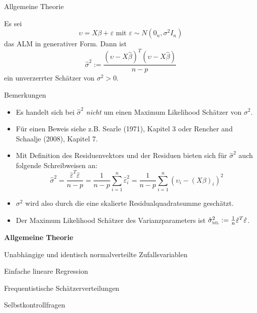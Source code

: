 \documentclass[
  8pt,
  ignorenonframetext,
]{beamer}
\providecommand{\tightlist}{%
  \setlength{\itemsep}{0pt}\setlength{\parskip}{0pt}}
\begin{document}
\begin{frame}{Allgemeine Theorie}
\protect\hypertarget{allgemeine-theorie-5}{}
\footnotesize
{}
\begin{theorem}[Varianzparameterschätzer]
\justifying
\normalfont
Es sei
\begin{equation}
\upsilon = X\beta + \varepsilon \mbox{ mit } \varepsilon \sim N(0_n,\sigma^2I_n)
\end{equation}
das ALM in generativer Form. Dann ist
\begin{equation}
\hat{\sigma}^2 := \frac{(\upsilon-X\hat{\beta})^T(\upsilon-X\hat{\beta})}{n - p}
\end{equation}
ein unverzerrter Schätzer von $\sigma^2 > 0$.
\end{theorem}
\vspace{-2mm}

\footnotesize

Bemerkungen

\begin{itemize}
\tightlist
\item
  Es handelt sich bei \(\hat{\sigma}^2\) \textit{nicht} um einen Maximum
  Likelihood Schätzer von \(\sigma^2\).
\item
  Für einen Beweis siehe z.B. Searle (1971), Kapitel 3 oder Rencher and
  Schaalje (2008), Kapitel 7.
\item
  Mit Definition des Residuenvektors und der Residuen bieten sich für
  \(\hat{\sigma}^2\) auch folgende Schreibweisen an: \begin{equation}
  \hat{\sigma}^2
  = \frac{\hat{\varepsilon}^T \hat{\varepsilon}}{n-p}
  = \frac{1}{n-p} \sum_{i=1}^n \hat{\varepsilon}_i^2
  = \frac{1}{n-p} \sum_{i=1}^n \left(\upsilon_i - (X\beta)_i \right)^2
  \end{equation}
\item
  \(\sigma^2\) wird also durch die eine skalierte Residualquadratsumme
  geschätzt.
\item
  Der Maximum Likelihood Schätzer des Varianzparameters ist
  \(\hat{\sigma}^2_{\tiny \mbox{ML}} := \frac{1}{n}\hat{\varepsilon}^T \hat{\varepsilon}\).
\end{itemize}
\end{frame}

\begin{frame}{}
\protect\hypertarget{section-9}{}
\large
{}
\vfill

\textbf{Allgemeine Theorie}

Unabhängige und identisch normalverteilte Zufallsvariablen

Einfache lineare Regression

Frequentistische Schätzerverteilungen

Selbstkontrollfragen \vfill
\end{frame}
\end{document}
